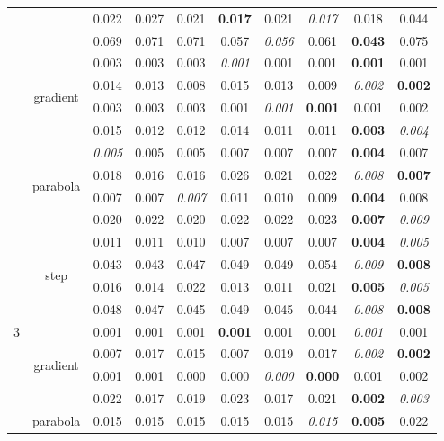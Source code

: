 \documentclass[authoryear, review, 11pt]{elsarticle}
\begin{document}
\begin{table}[ht]
\begin{center}
\begin{tabular}{cccccccccc}
		  & & 0.022 & 0.027 & 0.021 & \textbf{0.017} & 0.021 & \emph{0.017} & 0.018 & 0.044 \\ 
		  & & 0.069 & 0.071 & 0.071 & 0.057 & \emph{0.056} & 0.061 & \textbf{0.043} & 0.075 \\ 
		  \cline{2-10}
		  & \multirow{4}{*}{gradient} & 0.003 & 0.003 & 0.003 & \emph{0.001} & 0.001 & 0.001 & \textbf{0.001} & 0.001 \\ 
		  & & 0.014 & 0.013 & 0.008 & 0.015 & 0.013 & 0.009 & \emph{0.002} & \textbf{0.002} \\ 
		  & & 0.003 & 0.003 & 0.003 & 0.001 & \emph{0.001} & \textbf{0.001} & 0.001 & 0.002 \\ 
		  & & 0.015 & 0.012 & 0.012 & 0.014 & 0.011 & 0.011 & \textbf{0.003} & \emph{0.004} \\ 
		  \cline{2-10}
		  & \multirow{4}{*}{parabola} & \emph{0.005} & 0.005 & 0.005 & 0.007 & 0.007 & 0.007 & \textbf{0.004} & 0.007 \\ 
		  & & 0.018 & 0.016 & 0.016 & 0.026 & 0.021 & 0.022 & \emph{0.008} & \textbf{0.007} \\ 
		  & & 0.007 & 0.007 & \emph{0.007} & 0.011 & 0.010 & 0.009 & \textbf{0.004} & 0.008 \\ 
		  & & 0.020 & 0.022 & 0.020 & 0.022 & 0.022 & 0.023 & \textbf{0.007} & \emph{0.009} \\ 
		  \hline
		  \multirow{12}{*}{3} & \multirow{4}{*}{step} & 0.011 & 0.011 & 0.010 & 0.007 & 0.007 & 0.007 & \textbf{0.004} & \emph{0.005} \\ 
		  & & 0.043 & 0.043 & 0.047 & 0.049 & 0.049 & 0.054 & \emph{0.009} & \textbf{0.008} \\ 
		  & & 0.016 & 0.014 & 0.022 & 0.013 & 0.011 & 0.021 & \textbf{0.005} & \emph{0.005} \\ 
		  & & 0.048 & 0.047 & 0.045 & 0.049 & 0.045 & 0.044 & \emph{0.008} & \textbf{0.008} \\ 
		  \cline{2-10}
		  & \multirow{4}{*}{gradient} & 0.001 & 0.001 & 0.001 & \textbf{0.001} & 0.001 & 0.001 & \emph{0.001} & 0.001 \\ 
		  & & 0.007 & 0.017 & 0.015 & 0.007 & 0.019 & 0.017 & \emph{0.002} & \textbf{0.002} \\ 
		  & & 0.001 & 0.001 & 0.000 & 0.000 & \emph{0.000} & \textbf{0.000} & 0.001 & 0.002 \\ 
		  & & 0.022 & 0.017 & 0.019 & 0.023 & 0.017 & 0.021 & \textbf{0.002} & \emph{0.003} \\ 
		  \cline{2-10}
		  & \multirow{4}{*}{parabola} & 0.015 & 0.015 & 0.015 & 0.015 & 0.015 & \emph{0.015} & \textbf{0.005} & 0.022 \\ 

\end{tabular}
\end{center}
\end{table}
\end{document}
